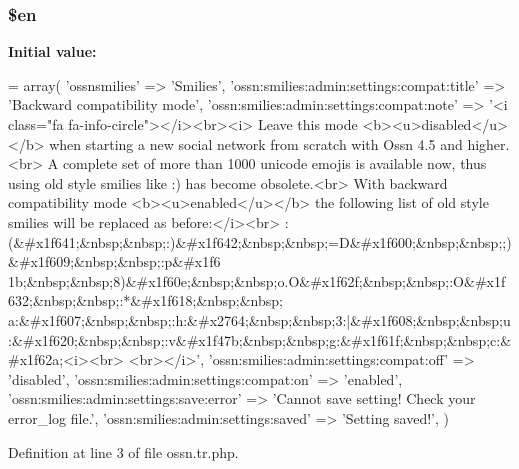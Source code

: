 \subsubsection[{\texorpdfstring{\$en}{$en}}]{\setlength{\rightskip}{0pt plus 5cm}\$en}\hypertarget{components_2_ossn_smilies_2locale_2ossn_8tr_8php_a48abc714dfb71c8fffa83cf49f452115}{}\label{components_2_ossn_smilies_2locale_2ossn_8tr_8php_a48abc714dfb71c8fffa83cf49f452115}
{\bfseries Initial value\+:}
\begin{DoxyCode}
= array(
        \textcolor{stringliteral}{'ossnsmilies'} => \textcolor{stringliteral}{'Smilies'},
        \textcolor{stringliteral}{'ossn:smilies:admin:settings:compat:title'} => \textcolor{stringliteral}{'Backward compatibility mode'},
        \textcolor{stringliteral}{'ossn:smilies:admin:settings:compat:note'} => \textcolor{stringliteral}{'<i class="fa fa-info-circle"></i><br><i>}
\textcolor{stringliteral}{        Leave this mode <b><u>disabled</u></b> when starting a new social network from scratch with Ossn
       4.5 and higher.<br>}
\textcolor{stringliteral}{        A complete set of more than 1000 unicode emojis is available now, thus using old style smilies like
       :) has become obsolete.<br>}
\textcolor{stringliteral}{        With backward compatibility mode <b><u>enabled</u></b> the following list of old style smilies will
       be replaced as before:</i><br>}
\textcolor{stringliteral}{        
      :(&#x1f641;&nbsp;&nbsp;:)&#x1f642;&nbsp;&nbsp;=D&#x1f600;&nbsp;&nbsp;;)&#x1f609;&nbsp;&nbsp;:p&#x1f6
      1b;&nbsp;&nbsp;8)&#x1f60e;&nbsp;&nbsp;o.O&#x1f62f;&nbsp;&nbsp;:O&#x1f632;&nbsp;&nbsp;:*&#x1f618;&nbsp;&nbsp;
      a:&#x1f607;&nbsp;&nbsp;:h:&#x2764;&nbsp;&nbsp;3:|&#x1f608;&nbsp;&nbsp;u:&#x1f620;&nbsp;&nbsp;:v&#x1f47b;&nbsp;&nbsp;g:&#x1f61f;&nbsp;&nbsp;c:&#x1f62a;<i><br>}
\textcolor{stringliteral}{        <br></i>'},
        \textcolor{stringliteral}{'ossn:smilies:admin:settings:compat:off'} => \textcolor{stringliteral}{'disabled'},
        \textcolor{stringliteral}{'ossn:smilies:admin:settings:compat:on'} => \textcolor{stringliteral}{'enabled'},
        \textcolor{stringliteral}{'ossn:smilies:admin:settings:save:error'} => \textcolor{stringliteral}{'Cannot save setting! Check your error\_log file.'},
        \textcolor{stringliteral}{'ossn:smilies:admin:settings:saved'} => \textcolor{stringliteral}{'Setting saved!'},
)
\end{DoxyCode}


Definition at line 3 of file ossn.\+tr.\+php.

